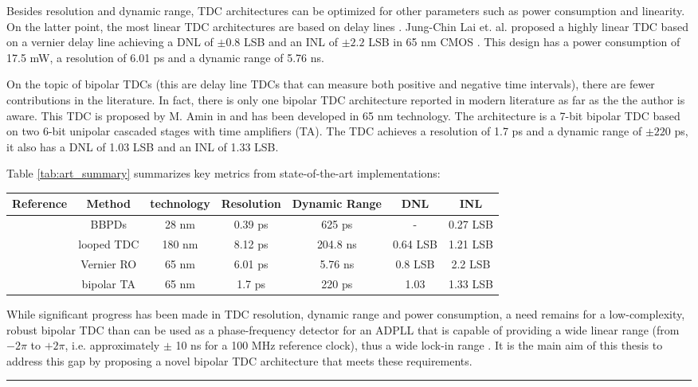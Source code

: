 Besides resolution and dynamic range, TDC architectures can be optimized for other parameters such as power consumption and linearity. On the latter point, the most linear TDC architectures are based on delay lines
\cite{Henzler2010}. Jung-Chin Lai et. al. proposed a highly linear TDC based on a vernier delay line achieving a DNL of $\pm 0.8$ LSB and an INL of $\pm 2.2$ LSB in 65 nm CMOS \cite{Lai2017}. This design has a
power consumption of 17.5 mW, a resolution of 6.01 ps and a dynamic range of 5.76 ns.


On the topic of bipolar TDCs (this are delay line TDCs that can measure both positive and negative time intervals), there are fewer contributions in the literature. In fact, there is only one bipolar TDC architecture
reported in modern literature as far as the the author is aware. This TDC is proposed by M. Amin in \cite{MohammadAmin2022} and has been developed in 65 nm technology. The architecture is a 7-bit bipolar TDC based
on two 6-bit unipolar cascaded stages with time amplifiers (TA). The TDC achieves a resolution of 1.7 ps and a dynamic range of $\pm 220$ ps, it also has a DNL of 1.03 LSB and an INL of 1.33 LSB.

Table \ref{tab:art_summary} summarizes key metrics from state-of-the-art implementations:

{\scriptsize
\begin{tabular*}{1\linewidth}{@{\extracolsep{\fill}}ccccccc}
    \hline
    Reference & Method & technology & Resolution & Dynamic Range & DNL & INL \\
    \hline
    \cite{Meng2025} & BBPDs & 28 nm & 0.39 ps & 625 ps & - & 0.27 LSB \\
    \cite{Narku-Tetteh2014} & looped TDC & 180 nm & 8.12 ps & 204.8 ns & 0.64 LSB & 1.21 LSB \\
    \cite{Lai2017} & Vernier RO & 65 nm & 6.01 ps & 5.76 ns & 0.8 LSB & 2.2 LSB \\
    \cite{MohammadAmin2022} & bipolar TA & 65 nm & 1.7 ps & 220 ps & 1.03 & 1.33 LSB \\
\end{tabular*}
}
\label{tab:art_summary}

\vspace{0.5cm}

While significant progress has been made in TDC resolution, dynamic range and power consumption, a need remains for a low-complexity, robust bipolar TDC than can be used as a phase-frequency detector
for an ADPLL that is capable of providing a wide linear range (from $-2\pi$ to $+2\pi$, i.e. approximately $\pm$ 10 ns for a 100 MHz reference clock), thus a wide lock-in range \cite{Meng2025}. It is the main
aim of this thesis to address this gap by proposing a novel bipolar TDC architecture that meets these requirements.

\noindent\rule{\textwidth}{1pt}